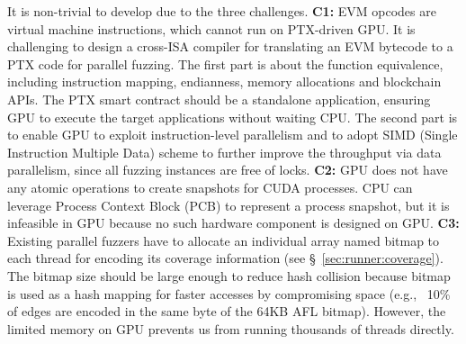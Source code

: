 It is non-trivial to develop {\tool} due to the three challenges. 
\textbf{C1:} 
EVM opcodes are virtual machine instructions, which cannot run on PTX-driven GPU. 
It is challenging to design a cross-ISA compiler for translating an EVM bytecode to a PTX code for parallel fuzzing. 
The first part is about the function equivalence, including instruction mapping, endianness, memory allocations and blockchain APIs. The PTX smart contract should be a standalone application, ensuring GPU to execute the target applications without waiting CPU. 
The second part is to enable GPU to exploit instruction-level parallelism and to adopt SIMD (Single Instruction Multiple Data) scheme to further improve the throughput via data parallelism\cite{falk2018vectorized, cuda2006datapara}, since all fuzzing instances are free of locks. 
%
%
\textbf{C2:} 
GPU does not have any atomic operations to create snapshots for CUDA processes. 
CPU can leverage Process Context Block (PCB) to represent a process snapshot, but it is infeasible in GPU because no such hardware component is designed on GPU.
%
\textbf{C3:} 
Existing parallel fuzzers\cite{afl, angora_sp} have to allocate an individual array named bitmap to each thread for encoding its coverage information (see \S~\ref{sec:runner:coverage}). 
The bitmap size should be large enough to reduce hash collision because bitmap is used as a hash mapping for faster accesses by compromising space (e.g., ~10\% of edges are encoded in the same byte of the 64KB AFL bitmap\cite{ding2021hardware}). 
However, the limited memory on GPU prevents us from running thousands of threads directly.

